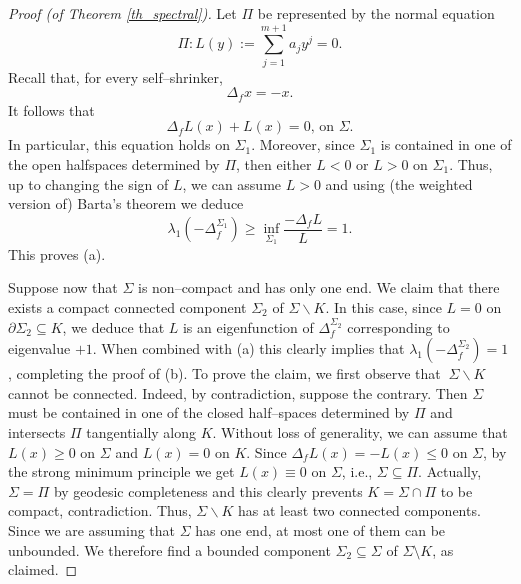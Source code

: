 \documentclass[11pt,leqno]{amsart}\usepackage{amsmath}
\numberwithin{equation}{section}
\begin{document}
\begin{proof}[Proof (of Theorem \ref{th_spectral})]
Let $\Pi$ be represented by the normal equation\[
\Pi:L\left(  y\right)  :=\sum_{j=1}^{m+1}a_{j}y^{j}=0.
\]
Recall that, for every self--shrinker,\[
\Delta_{f}x=-x.
\]
It follows that\[
\Delta_{f}L\left(  x\right)  +L\left(  x\right)  =0\text{, on }\Sigma.
\]
In particular, this equation holds on $\Sigma_{1}$. Moreover, since
$\Sigma_{1}$ is contained in one of the open halfspaces determined by $\Pi$,
then either $L<0$ or $L>0$ on $\Sigma_{1}$. Thus, up to changing the sign of
$L$, we can assume $L>0$ and using (the weighted version of) Barta's theorem
we deduce\[
\lambda_{1}(  -\Delta_{f}^{\Sigma_{1}})  \geq \inf_{\Sigma_1}\frac{-\Delta_{f}L}{L}=1.
\]
This proves (a).

Suppose now that $\Sigma$ is non--compact and has only one end. We claim that there
exists a compact connected component $\Sigma_{2}$ of $\Sigma\backslash K$. In
this case, since $L=0$ on $\partial\Sigma_{2}\subseteq K$, we deduce that $L$
is an eigenfunction of $\Delta_{f}^{\Sigma_{2}}$ corresponding to eigenvalue
$+1$. When combined with (a) this clearly implies that $\lambda_{1}(-\Delta_{f}^{\Sigma_{2}})=1$, completing the proof of (b). To prove the
claim, we first observe that $\ \Sigma\backslash K$ cannot be connected.
Indeed, by contradiction, suppose the contrary. Then $\Sigma$ must be
contained in one of the closed half--spaces determined by $\Pi$ and intersects
$\Pi$ tangentially along $K$. Without loss of generality, we can assume that
$L\left(  x\right)  \geq0$ on $\Sigma$ and $L\left(  x\right)  =0$ on $K$.
Since $\Delta_{f}L\left(  x\right)  =-L\left(  x\right)  \leq0$ on $\Sigma$,
by the strong minimum principle we get $L\left(  x\right)  \equiv0$ on
$\Sigma$, i.e., $\Sigma\subseteq\Pi$. Actually, $\Sigma=\Pi$ by geodesic
completeness and this clearly prevents $K=\Sigma\cap\Pi$ to be compact,
contradiction. Thus, $\Sigma\backslash K$ has at least two connected
components. Since we are assuming that $\Sigma$ has one end, at most one of
them can be unbounded. We
therefore find a bounded component $\Sigma_{2}\subseteq\Sigma$ of $\Sigma\setminus K$, as claimed.


\end{proof}
\end{document}
